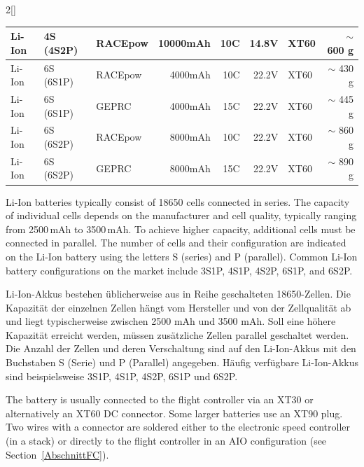 \begin{paracol}{2}[]
\begin{table}[htb!]
\begin{tabularx}{\textwidth}{Xllrrrlr}
Li-Ion & 4S (4S2P) & RACEpow     & 10000mAh & 10C  & 14.8V & XT60 & \(\sim\) 600 g   \\
\midrule 
Li-Ion & 6S (6S1P) & RACEpow     & 4000mAh  & 10C  & 22.2V & XT60 & \(\sim\) 430 g   \\
Li-Ion & 6S (6S1P) & GEPRC       & 4000mAh  & 15C  & 22.2V & XT60 & \(\sim\) 445 g   \\
Li-Ion & 6S (6S2P) & RACEpow     & 8000mAh  & 10C  & 22.2V & XT60 & \(\sim\) 860 g   \\
Li-Ion & 6S (6S2P) & GEPRC       & 8000mAh  & 15C  & 22.2V & XT60 & \(\sim\) 890 g   \\
\bottomrule
\end{tabularx}
\end{table}
\FloatBarrier

\colstart


Li-Ion batteries typically consist of 18650 cells connected in series. The capacity of individual cells depends on the manufacturer and cell quality, typically ranging from 2500\,mAh to 3500\,mAh. To achieve higher capacity, additional cells must be connected in parallel. The number of cells and their configuration are indicated on the Li-Ion battery using the letters S (series) and P (parallel). Common Li-Ion battery configurations on the market include 3S1P, 4S1P, 4S2P, 6S1P, and 6S2P.

\colger

Li-Ion-Akkus bestehen üblicherweise aus in Reihe geschalteten 18650-Zellen. Die Kapazität der einzelnen Zellen hängt vom Hersteller und von der Zellqualität ab und liegt typischerweise zwischen 2500 mAh und 3500 mAh. Soll eine höhere Kapazität erreicht werden, müssen zusätzliche Zellen parallel geschaltet werden. Die Anzahl der Zellen und deren Verschaltung sind auf den Li-Ion-Akkus mit den Buchstaben S (Serie) und P (Parallel) angegeben. Häufig verfügbare Li-Ion-Akkus sind beispielsweise 3S1P, 4S1P, 4S2P, 6S1P und 6S2P.

\colende

\renewcommand{\deutschertitel}{Stecker (XT30/XT60/XT90) zum Entladen und Laden}
\renewcommand{\englischertitel}{Plugs (XT30/XT60/XT90) for Discharge and Charge}
\makrounterabschnitt
\label{AbschnittSteckerAkkus}

The battery is usually connected to the flight controller via an XT30 or alternatively an XT60 DC connector. Some larger batteries use an XT90 plug. Two wires with a connector are soldered either to the electronic speed controller (in a stack) or directly to the flight controller in an AIO configuration (see Section~\ref{AbschnittFC}).


\end{paracol}
